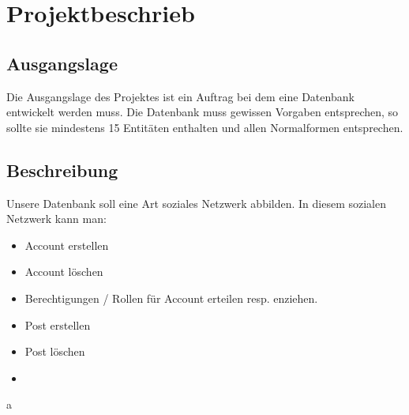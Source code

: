\documentclass[12pt,twoside,a4paper]{article}
\title{\titleText}
\author{\authorText}
\date{\dateText}
\begin{document}
	\maketitle
	\tableofcontents
	\section {Projektbeschrieb}
	
	\subsection{Ausgangslage}
	
	Die Ausgangslage des Projektes ist ein Auftrag bei dem eine Datenbank entwickelt werden muss. Die Datenbank muss gewissen Vorgaben entsprechen, so sollte sie mindestens 15 Entitäten enthalten und allen Normalformen entsprechen.
	
	\subsection{Beschreibung}
	
	Unsere Datenbank soll eine Art soziales Netzwerk abbilden. In diesem sozialen Netzwerk kann man:
	\begin{itemize}
		\item Account erstellen
		\item Account löschen
		\item Berechtigungen / Rollen für Account erteilen resp. enziehen.
		\item Post erstellen
		\item Post löschen
		\item 	
	\end{itemize}
	
	\clearpage
	a
\end{document}
